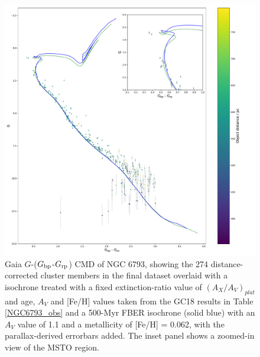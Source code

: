 \documentclass[12pt, a4paper]{report}
\begin{document}
\begin{figure}[h]
\begin{center}
\includegraphics[width=1.0\textwidth]{../NGC_6793_CMD_FeH_0p062_Av_1p1_500Myr_all_xloge_correction_no_xerr_isochrones_summary_errorbars.pdf}
\caption{Gaia $G$-($G_{\textnormal{bp}}$-$G_{\textnormal{rp}}$) CMD of NGC 6793, showing the 274 distance-corrected cluster members in the final dataset overlaid with a isochrone treated with a fixed extinction-ratio value of $(A_{X}/A_{V})_{plat}$ and age, $A_{V}$ and [Fe/H] values taken from the GC18 results in Table \ref{NGC6793_obs} and a 500-Myr FBER isochrone (solid blue) with an $A_{V}$ value of 1.1 and a metallicity of [Fe/H] = 0.062, with the parallax-derived errorbars added. The inset panel shows a zoomed-in view of the MSTO region.}
\label{NGC_6793_isoc_inset_1.1_500_0.062}
\end{center}
\end{figure}
\end{document}

